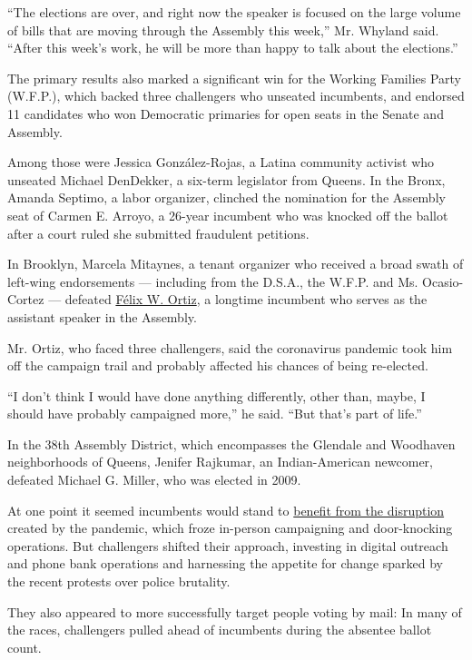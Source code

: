 ``The elections are over, and right now the speaker is focused on the
large volume of bills that are moving through the Assembly this week,''
Mr. Whyland said. ``After this week's work, he will be more than happy
to talk about the elections.''

The primary results also marked a significant win for the Working
Families Party (W.F.P.), which backed three challengers who unseated
incumbents, and endorsed 11 candidates who won Democratic primaries for
open seats in the Senate and Assembly.

Among those were Jessica González-Rojas, a Latina community activist who
unseated Michael DenDekker, a six-term legislator from Queens. In the
Bronx, Amanda Septimo, a labor organizer, clinched the nomination for
the Assembly seat of Carmen E. Arroyo, a 26-year incumbent who was
knocked off the ballot after a court ruled she submitted fraudulent
petitions.

In Brooklyn, Marcela Mitaynes, a tenant organizer who received a broad
swath of left-wing endorsements --- including from the D.S.A., the
W.F.P. and Ms. Ocasio-Cortez --- defeated
\href{https://nyassembly.gov/mem/Felix-W-Ortiz}{Félix W. Ortiz}, a
longtime incumbent who serves as the assistant speaker in the Assembly.

Mr. Ortiz, who faced three challengers, said the coronavirus pandemic
took him off the campaign trail and probably affected his chances of
being re-elected.

``I don't think I would have done anything differently, other than,
maybe, I should have probably campaigned more,'' he said. ``But that's
part of life.''

In the 38th Assembly District, which encompasses the Glendale and
Woodhaven neighborhoods of Queens, Jenifer Rajkumar, an Indian-American
newcomer, defeated Michael G. Miller, who was elected in 2009.

At one point it seemed incumbents would stand to
\href{https://www.nytimes.com/2020/06/18/nyregion/ny-progressives-elections-coronavirus.html}{benefit
from the disruption} created by the pandemic, which froze in-person
campaigning and door-knocking operations. But challengers shifted their
approach, investing in digital outreach and phone bank operations and
harnessing the appetite for change sparked by the recent protests over
police brutality.

They also appeared to more successfully target people voting by mail: In
many of the races, challengers pulled ahead of incumbents during the
absentee ballot count.

